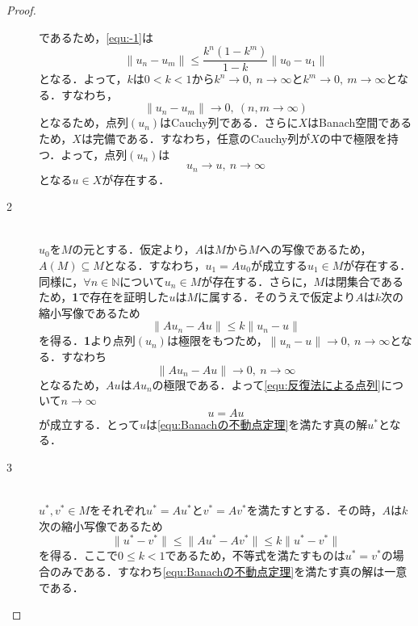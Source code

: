 \documentclass[11pt,a4paper,titlepage]{jsreport}
\theoremstyle{definition}
\begin{document}
\begin{proof}
\begin{description}
      であるため，\eqref{equ:-1}は
      \begin{equation}
        \|u_{n}-u_{m}\| \leq \frac{k^n(1-k^m)}{1-k} \|u_0-u_1\|
      \end{equation}
      となる．よって，$k$は$0<k<1$から$k^n\rightarrow 0,\ n\rightarrow \infty$と$k^m\rightarrow 0,\ m\rightarrow \infty$となる．すなわち，
      \begin{equation*}
        \|u_{n}-u_{m}\| \rightarrow 0,\ (n,m\rightarrow \infty)
      \end{equation*}
      となるため，点列$(u_n)$はCauchy列である．さらに$X$はBanach空間であるため，$X$は完備である．すなわち，任意のCauchy列が$X$の中で極限を持つ．よって，点列$(u_n)$は
      \begin{equation*}
        u_n\rightarrow u,\ n\rightarrow \infty
      \end{equation*}
      となる$u \in X$が存在する．

    \item[2]
      \quad\\
      $u_0$を$M$の元とする．仮定より，$A$は$M$から$M$への写像であるため，$A(M)\subseteq M$となる．すなわち，$u_1=Au_0$が成立する$u_1\in M$が存在する．同様に，$\forall n \in \mathbb{N}$について$u_n\in M$が存在する．さらに，$M$は閉集合であるため，\textbf{1}で存在を証明した$u$は$M$に属する．そのうえで仮定より$A$は$k$次の縮小写像であるため
      \begin{equation*}
        \|Au_n-Au\|\leq k\|u_n-u\|
      \end{equation*}
      を得る．\textbf{1}より点列$(u_n)$は極限をもつため，$\|u_n-u\|\rightarrow 0,\ n\rightarrow \infty$となる．すなわち
      \begin{equation*}
        \|Au_n-Au\|\rightarrow 0,\ n\rightarrow \infty
      \end{equation*}
      となるため，$Au$は$Au_n$の極限である．よって\eqref{equ:反復法による点列}について$n \rightarrow \infty$
      \begin{equation*}
        u=Au
      \end{equation*}
      が成立する．とって$u$は\eqref{equ:Banachの不動点定理}を満たす真の解$u^*$となる．

    \item[3]
      \quad\\
      $u^*,v^*\in M$をそれぞれ$u^*=Au^*$と$v^*=Av^*$を満たすとする．その時，$A$は$k$次の縮小写像であるため
      \begin{equation*}
        \|u^*-v^*\| \leq \|Au^*-Av^*\| \leq k\|u^*-v^*\|
      \end{equation*}
      を得る．ここで$0\leq k<1$であるため，不等式を満たすものは$u^*=v^*$の場合のみである．すなわち\eqref{equ:Banachの不動点定理}を満たす真の解は一意である．
  \end{description}

\end{proof}
\end{document}
